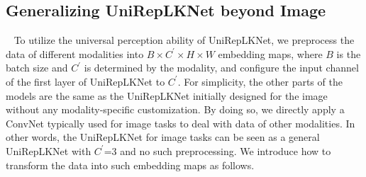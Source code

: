 \documentclass[10pt,twocolumn,letterpaper]{article}
\begin{document}
	\begin{table}
		\caption{Architectural hyper-parameters of UniRepLKNet instances, including the number of blocks in the four stages $N_1, N_2, N_3, N_4$ and channels $C$ of the first stage. Stage 1 uses SmaK Blocks, and Stages 2 and 4 use LarK Blocks only. For Stage 3, \eg, ``9 + 18'' means 9 LarK Blocks and 18 SmaK Blocks.}
		\label{table-instances}
		\vspace{-0.2in}
		\begin{center}
		\end{center}
		\vspace{-0.3in}
	\end{table}




\subsection{Generalizing UniRepLKNet beyond Image}~\label{sec:mm-design}
To utilize the universal perception ability of UniRepLKNet, we preprocess the data of different modalities into $B\times C^\prime\times H\times W$ embedding maps, where $B$ is the batch size and $C^\prime$ is determined by the modality, and configure the input channel of the first layer of UniRepLKNet to $C^\prime$. For simplicity, the other parts of the models are the same as the UniRepLKNet initially designed for the image without any modality-specific customization. By doing so, we directly apply a ConvNet typically used for image tasks to deal with data of other modalities. In other words, the UniRepLKNet for image tasks can be seen as a general UniRepLKNet with $C^\prime$=3 and no such preprocessing. We introduce how to transform the data into such embedding maps as follows.
\end{document}
